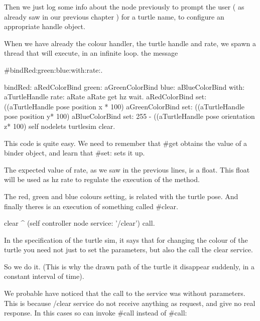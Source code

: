 \documentclass[a4paper,10pt,twoside]{book}
\begin{document}
		Then we just log some info about the node previously to prompt the user ( as already saw in our previous chapter ) for a turtle name, to configure an appropriate handle object.
		
		When we have already the colour handler, the turtle handle and rate, we spawn a thread that will execute, in an infinite loop. the message
		
		\#bindRed:green:blue:with:rate:.
		
		
		\begin{code}

bindRed: aRedColorBind green: aGreenColorBind  blue: aBlueColorBind with: aTurtleHandle  rate: aRate
	aRate get hz wait. 
	aRedColorBind set: ((aTurtleHandle pose position x * 100) %
	aGreenColorBind set: ((aTurtleHandle pose position y* 100) %
	aBlueColorBind set: 255 - ((aTurtleHandle pose orientation z* 100) %
	self nodelets turtlesim clear.


		\end{code}
		
		
		This code is quite easy. We need to remember that \#get obtains the value of a binder object, and learn that \#set: sets it up.
		
		The expected value of rate, as we saw in the previous lines, is a float. This float will be used as hz rate to regulate the execution of the method. 
		
		The red, green and blue colours setting, is related with the turtle pose. And finally theres is an execution of something called \#clear. 
		
		
		\begin{code}
clear
	^  (self controller node service: '/clear') call.
		
		
		\end{code}
		
		In the specification of the turtle sim, it says that for changing the colour of the turtle you need not just to set the parameters, but also the call the clear service. 
		
		So we do it. (This is why the drawn path of the turtle it disappear suddenly, in a constant interval of time).
		
		We probable have noticed that the call to the service was without parameters. This is because /clear service do not receive anything as request, and give no real response. In this cases so can invoke \#call instead of \#call: 
		
		
		
\end{document}
